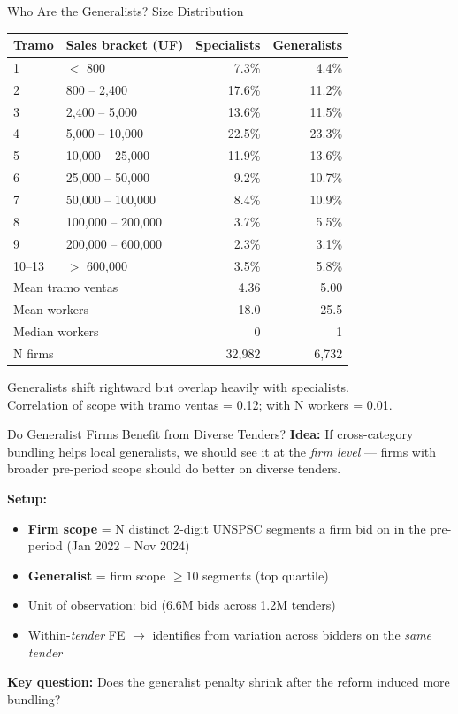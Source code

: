 \documentclass[9pt,aspectratio=169]{beamer}
\begin{document}
\begin{frame}{Who Are the Generalists? Size Distribution}
\centering\small
\begin{tabular}{llrr}
\toprule
Tramo & Sales bracket (UF) & Specialists & Generalists \\
\midrule
1 & $<$ 800 & 7.3\% & 4.4\% \\
2 & 800 -- 2,400 & 17.6\% & 11.2\% \\
3 & 2,400 -- 5,000 & 13.6\% & 11.5\% \\
4 & 5,000 -- 10,000 & 22.5\% & 23.3\% \\
5 & 10,000 -- 25,000 & 11.9\% & 13.6\% \\
6 & 25,000 -- 50,000 & 9.2\% & 10.7\% \\
7 & 50,000 -- 100,000 & 8.4\% & 10.9\% \\
8 & 100,000 -- 200,000 & 3.7\% & 5.5\% \\
9 & 200,000 -- 600,000 & 2.3\% & 3.1\% \\
10--13 & $>$ 600,000 & 3.5\% & 5.8\% \\
\midrule
\multicolumn{2}{l}{Mean tramo ventas} & 4.36 & 5.00 \\
\multicolumn{2}{l}{Mean workers} & 18.0 & 25.5 \\
\multicolumn{2}{l}{Median workers} & 0 & 1 \\
\multicolumn{2}{l}{N firms} & 32,982 & 6,732 \\
\bottomrule
\end{tabular}

\bigskip
\small Generalists shift rightward but overlap heavily with specialists. \\
Correlation of scope with tramo ventas = 0.12; with N workers = 0.01.
\end{frame}

\begin{frame}{Do Generalist Firms Benefit from Diverse Tenders?}
\textbf{Idea:} If cross-category bundling helps local generalists, we should see it
at the \textit{firm level} --- firms with broader pre-period scope should do better on diverse tenders.

\bigskip
\textbf{Setup:}
\begin{itemize}
  \item \textbf{Firm scope} = N distinct 2-digit UNSPSC segments a firm bid on in the pre-period (Jan 2022 -- Nov 2024)
  \item \textbf{Generalist} = firm scope $\geq 10$ segments (top quartile)
  \item Unit of observation: bid (6.6M bids across 1.2M tenders)
  \item Within-\textit{tender} FE $\to$ identifies from variation across bidders on the \textit{same tender}
\end{itemize}

\bigskip
\textbf{Key question:} Does the generalist penalty shrink after the reform induced more bundling?
\end{frame}
\end{document}
